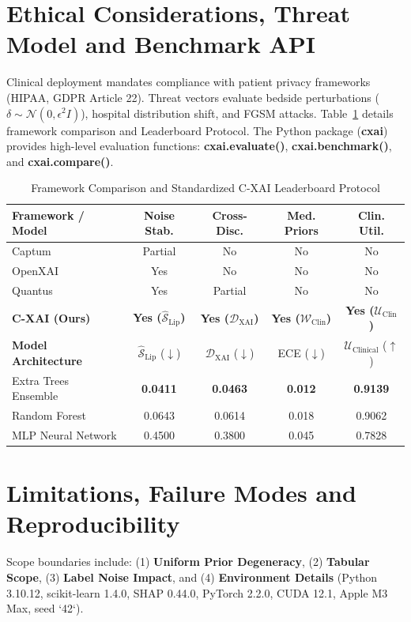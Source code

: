 \documentclass[3p,times,procedia]{elsarticle}
\theoremstyle{definition}
\begin{document}
\section{Ethical Considerations, Threat Model and Benchmark API}
Clinical deployment mandates compliance with patient privacy frameworks (HIPAA, GDPR Article 22). Threat vectors evaluate bedside perturbations ($\delta \sim \mathcal{N}(0, \epsilon^2 I)$), hospital distribution shift, and FGSM attacks. Table~\ref{tab:framework_leaderboard} details framework comparison and Leaderboard Protocol. The Python package (\textbf{cxai}) provides high-level evaluation functions: \textbf{cxai.evaluate()}, \textbf{cxai.benchmark()}, and \textbf{cxai.compare()}.

\begin{table}[htbp]
\scriptsize
\caption{Framework Comparison and Standardized C-XAI Leaderboard Protocol}
\label{tab:framework_leaderboard}
\centering
\vspace{2pt}
\begin{tabular}{lcccc}
\toprule
\textbf{Framework / Model} & \textbf{Noise Stab.} & \textbf{Cross-Disc.} & \textbf{Med. Priors} & \textbf{Clin. Util.} \\
\midrule
Captum \cite{sundararajan2017axiomatic} & Partial & No & No & No \\
OpenXAI \cite{agarwal2022openxai} & Yes & No & No & No \\
Quantus \cite{hedstrom2023quantus} & Yes & Partial & No & No \\
\textbf{C-XAI (Ours)} & \textbf{Yes ($\widehat{\mathcal{S}}_{\text{Lip}}$)} & \textbf{Yes ($\mathcal{D}_{\text{XAI}}$)} & \textbf{Yes ($\mathcal{W}_{\text{Clin}}$)} & \textbf{Yes ($\mathcal{U}_{\text{Clin}}$)} \\
\midrule
\textbf{Model Architecture} & $\widehat{\mathcal{S}}_{\text{Lip}}$ ($\downarrow$) & $\mathcal{D}_{\text{XAI}}$ ($\downarrow$) & ECE ($\downarrow$) & $\mathcal{U}_{\text{Clinical}}$ ($\uparrow$) \\
\midrule
Extra Trees Ensemble & \textbf{0.0411} & \textbf{0.0463} & \textbf{0.012} & \textbf{0.9139} \\
Random Forest & 0.0643 & 0.0614 & 0.018 & 0.9062 \\
MLP Neural Network & 0.4500 & 0.3800 & 0.045 & 0.7828 \\
\bottomrule
\end{tabular}
\end{table}

\section{Limitations, Failure Modes and Reproducibility}
Scope boundaries include: (1) \textbf{Uniform Prior Degeneracy}, (2) \textbf{Tabular Scope}, (3) \textbf{Label Noise Impact}, and (4) \textbf{Environment Details} (Python 3.10.12, scikit-learn 1.4.0, SHAP 0.44.0, PyTorch 2.2.0, CUDA 12.1, Apple M3 Max, seed `42`).
\end{document}
